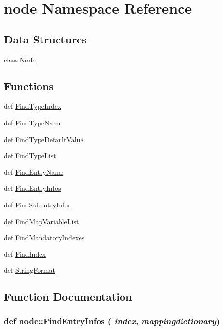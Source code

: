 \hypertarget{namespacenode}{
\section{node Namespace Reference}
\label{namespacenode}
}


\subsection*{Data Structures}
\begin{CompactItemize}
\item 
class \hyperlink{classnode_1_1Node}{Node}
\end{CompactItemize}
\subsection*{Functions}
\begin{CompactItemize}
\item 
def \hyperlink{namespacenode_251f8d2fab99af17a69618eb9a9aa01d}{Find\-Type\-Index}
\item 
def \hyperlink{namespacenode_ec2e771eabdaed0591645766a7979000}{Find\-Type\-Name}
\item 
def \hyperlink{namespacenode_5165d2e252cbc529a9b477f2356f7554}{Find\-Type\-Default\-Value}
\item 
def \hyperlink{namespacenode_b275546f2219df55852ad6f1f5cc7a4c}{Find\-Type\-List}
\item 
def \hyperlink{namespacenode_6f50edd49a143e12a1b6451678c126b9}{Find\-Entry\-Name}
\item 
def \hyperlink{namespacenode_aa2e7dbc3a50a6c983cea1c976ea2492}{Find\-Entry\-Infos}
\item 
def \hyperlink{namespacenode_c0fbae8b8d48542bb6018fe70275e652}{Find\-Subentry\-Infos}
\item 
def \hyperlink{namespacenode_3cabdb0f72121bc955d7dbd333a727b1}{Find\-Map\-Variable\-List}
\item 
def \hyperlink{namespacenode_3538450156618ef27f500ca7cda2c401}{Find\-Mandatory\-Indexes}
\item 
def \hyperlink{namespacenode_e87bc221d6720e73d680c1a187d14fa9}{Find\-Index}
\item 
def \hyperlink{namespacenode_8744929d28d5a0e9e9c6f2d7a75a5df2}{String\-Format}
\end{CompactItemize}


\subsection{Function Documentation}
\hypertarget{namespacenode_aa2e7dbc3a50a6c983cea1c976ea2492}{
\subsubsection[FindEntryInfos]{\setlength{\rightskip}{0pt plus 5cm}def node::Find\-Entry\-Infos ( {\em index},  {\em mappingdictionary})}}
\label{namespacenode_aa2e7dbc3a50a6c983cea1c976ea2492}




